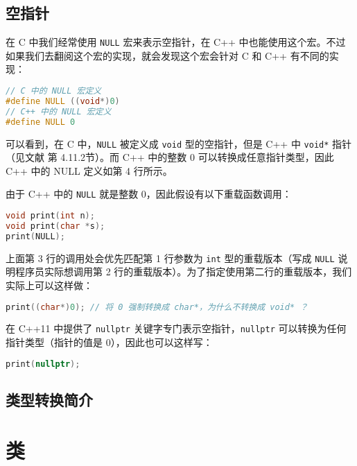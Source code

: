\documentclass[hyperref,UTF8]{article}
\begin{document}
\subsection{空指针}

在 C 中我们经常使用 \texttt{NULL} 宏来表示空指针，在 C++ 中也能使用这个宏。不过如果我们去翻阅这个宏的实现，就会发现这个宏会针对 C 和 C++ 有不同的实现：
\begin{lstlisting}[language=c++]
// C 中的 NULL 宏定义
#define NULL ((void*)0)
// C++ 中的 NULL 宏定义
#define NULL 0
\end{lstlisting}
可以看到，在 C 中，\texttt{NULL} 被定义成 \texttt{void} 型的空指针，但是 C++ 中 \texttt{void*} 指针（见文献 \cite{Lippman2013C} 第 4.11.2节）。而 C++ 中的整数 0 可以转换成任意指针类型，因此 C++ 中的 NULL 定义如第 4 行所示。

由于 C++ 中的 \texttt{NULL} 就是整数 0，因此假设有以下重载函数调用：
\begin{lstlisting}[language=c++]
void print(int n);
void print(char *s);
print(NULL);
\end{lstlisting}
上面第 3 行的调用处会优先匹配第 1 行参数为 \texttt{int} 型的重载版本（写成 \texttt{NULL} 说明程序员实际想调用第 2 行的重载版本）。为了指定使用第二行的重载版本，我们实际上可以这样做：
\begin{lstlisting}[language=c++,numbers=none]
print((char*)0); // 将 0 强制转换成 char*，为什么不转换成 void* ？
\end{lstlisting}
在 C++11 中提供了 \texttt{nullptr} 关键字专门表示空指针，\texttt{nullptr} 可以转换为任何指针类型（指针的值是 0），因此也可以这样写：
\begin{lstlisting}[language=c++,numbers=none,style=c++11]
print(nullptr);
\end{lstlisting}

\subsection{类型转换简介}

\section{类}
\end{document}
